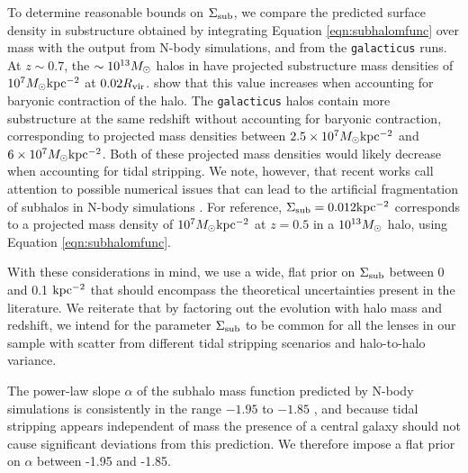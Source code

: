 To determine reasonable bounds on $\Sigma_{\rm{sub}}$, we compare the predicted surface density in substructure obtained by integrating Equation \ref{eqn:subhalomfunc} over mass with the output from N-body simulations, and from the {\tt{galacticus}} runs. At $z \sim 0.7$, the $\sim 10^{13} {M_{\odot}}$ halos in \citet{Fiacconi++16} have projected substructure mass densities of $10^7 {M_{\odot}} \rm{kpc^{-2}}$ at $0.02 R_{\rm{vir}}$. \citet{Fiacconi++16} show that this value increases when accounting for baryonic contraction of the halo. The {\tt{galacticus}} halos contain more substructure at the same redshift without accounting for baryonic contraction, corresponding to projected mass densities between $2.5 \times 10^{7} {M_{\odot}} \rm{kpc^{-2}}$ and $6 \times 10^{7} {M_{\odot}} \rm{kpc^{-2}}$. Both of these projected mass densities would likely decrease when accounting for tidal stripping. We note, however, that recent works call attention to possible numerical issues that can lead to the artificial fragmentation of subhalos in N-body simulations \citep{vandenBosch++18,ErraniPenarrubia19}. For reference, $\Sigma_{\rm{sub}} = 0.012 \rm{kpc^{-2}}$ corresponds to a projected mass density of $10^{7}{M_{\odot}} \rm{kpc^{-2}}$ at $z=0.5$ in a $10^{13}{M_{\odot}}$ halo, using Equation \ref{eqn:subhalomfunc}. 

With these considerations in mind, we use a wide, flat prior on $\Sigma_{\rm{sub}}$ between 0 and 0.1 $\rm{kpc^{-2}}$ that should encompass the theoretical uncertainties present in the literature. We reiterate that by factoring out the evolution with halo mass and redshift, we intend for the parameter $\Sigma_{\rm{sub}}$ to be common for all the lenses in our sample with scatter from different tidal stripping scenarios and halo-to-halo variance.

The power-law slope $\alpha$ of the subhalo mass function predicted by N-body simulations is consistently in the range $-1.95$ to $-1.85$ \citep{Springel++08,Fiacconi++16}, and because tidal stripping appears independent of mass the presence of a central galaxy should not cause significant deviations from this prediction. We therefore impose a flat prior on $\alpha$ between -1.95 and -1.85. 

